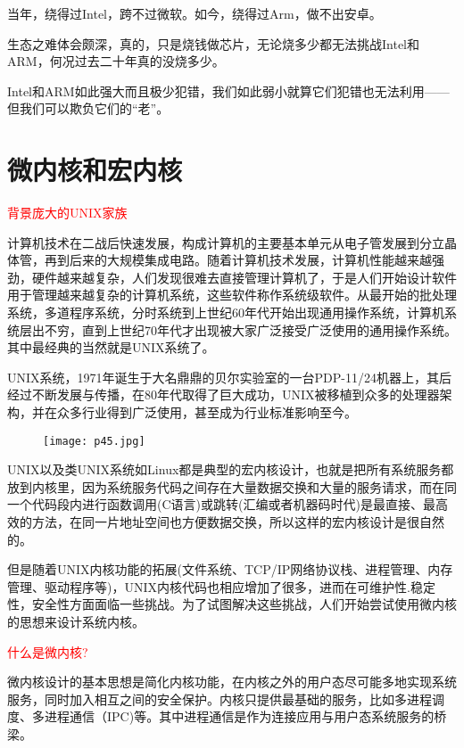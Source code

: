 \documentclass[utf8]{book}
\begin{document}
	当年，绕得过Intel，跨不过微软。如今，绕得过Arm，做不出安卓。
	
	生态之难体会颇深，真的，只是烧钱做芯片，无论烧多少都无法挑战Intel和ARM，何况过去二十年真的没烧多少。
	
	Intel和ARM如此强大而且极少犯错，我们如此弱小就算它们犯错也无法利用——但我们可以欺负它们的“老”。

\section{微内核和宏内核}

{\Large \textcolor{red}{背景庞大的UNIX家族}}

计算机技术在二战后快速发展，构成计算机的主要基本单元从电子管发展到分立晶体管，再到后来的大规模集成电路。随着计算机技术发展，计算机性能越来越强劲，硬件越来越复杂，人们发现很难去直接管理计算机了，于是人们开始设计软件用于管理越来越复杂的计算机系统，这些软件称作系统级软件。从最开始的批处理系统，多道程序系统，分时系统到上世纪60年代开始出现通用操作系统，计算机系统层出不穷，直到上世纪70年代才出现被大家广泛接受广泛使用的通用操作系统。其中最经典的当然就是UNIX系统了。

UNIX系统，1971年诞生于大名鼎鼎的贝尔实验室的一台PDP-11/24机器上，其后经过不断发展与传播，在80年代取得了巨大成功，UNIX被移植到众多的处理器架构，并在众多行业得到广泛使用，甚至成为行业标准影响至今。

	\begin{figure}[H]
	\centering
	\texttt{[image: p45.jpg]}
	\end{figure}

UNIX以及类UNIX系统如Linux都是典型的宏内核设计，也就是把所有系统服务都放到内核里，因为系统服务代码之间存在大量数据交换和大量的服务请求，而在同一个代码段内进行函数调用(C语言)或跳转(汇编或者机器码时代)是最直接、最高效的方法，在同一片地址空间也方便数据交换，所以这样的宏内核设计是很自然的。

但是随着UNIX内核功能的拓展(文件系统、TCP/IP网络协议栈、进程管理、内存管理、驱动程序等)，UNIX内核代码也相应增加了很多，进而在可维护性.稳定性，安全性方面面临一些挑战。为了试图解决这些挑战，人们开始尝试使用微内核的思想来设计系统内核。

{\Large \textcolor{red}{什么是微内核?}}

微内核设计的基本思想是简化内核功能，在内核之外的用户态尽可能多地实现系统服务，同时加入相互之间的安全保护。内核只提供最基础的服务，比如多进程调度、多进程通信（IPC)等。其中进程通信是作为连接应用与用户态系统服务的桥梁。
\end{document}
